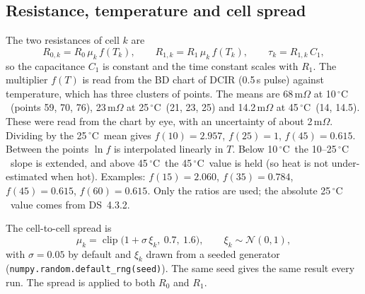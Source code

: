 \documentclass[11pt,a4paper]{article}
\newcommand{\ds}[1]{\textsc{DS}~#1}
\newcommand{\degC}{\ensuremath{{}^{\circ}\mathrm{C}}}
\begin{document}
\subsection{Resistance, temperature and cell spread}
The two resistances of cell $k$ are
\begin{equation}
R_{0,k}=R_{0}\,\mu_k\,f(T_k),\qquad R_{1,k}=R_{1}\,\mu_k\,f(T_k),\qquad \tau_k=R_{1,k}\,C_1 ,
\end{equation}
so the capacitance $C_1$ is constant and the time constant scales with $R_1$. The multiplier $f(T)$ is read from the BD chart of DCIR (0.5\,s pulse) against temperature, which has three clusters of points. The means are 68\,m$\Omega$ at 10\,\degC\ (points 59, 70, 76), 23\,m$\Omega$ at 25\,\degC\ (21, 23, 25) and 14.2\,m$\Omega$ at 45\,\degC\ (14, 14.5). These were read from the chart by eye, with an uncertainty of about 2\,m$\Omega$. Dividing by the 25\,\degC\ mean gives $f(10)=2.957$, $f(25)=1$, $f(45)=0.615$. Between the points $\ln f$ is interpolated linearly in $T$. Below 10\,\degC\ the 10--25\,\degC\ slope is extended, and above 45\,\degC\ the 45\,\degC\ value is held (so heat is not under-estimated when hot). Examples: $f(15)=2.060$, $f(35)=0.784$, $f(45)=0.615$, $f(60)=0.615$. Only the ratios are used; the absolute 25\,\degC\ value comes from \ds{4.3.2}.

The cell-to-cell spread is
\begin{equation}
\mu_k=\operatorname{clip}\big(1+\sigma\,\xi_k,\ 0.7,\ 1.6\big),\qquad \xi_k\sim\mathcal{N}(0,1),
\end{equation}
with $\sigma=0.05$ by default and $\xi_k$ drawn from a seeded generator (\texttt{numpy.random.default\_rng(seed)}). The same seed gives the same result every run. The spread is applied to both $R_0$ and $R_1$.
\end{document}
